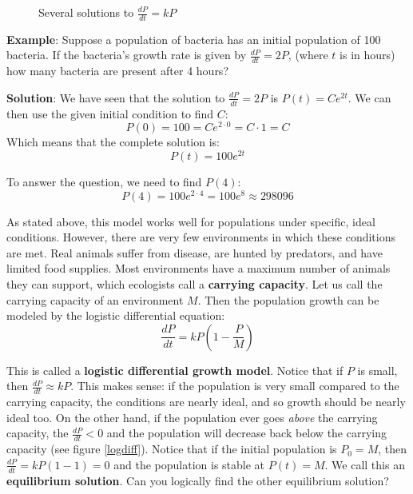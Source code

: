 \begin{figure}
\centering
    \caption{Several solutions to $\frac{dP}{dt} = kP$}
    \label{expdiff}
\end{figure}


\textbf{Example}: Suppose a population of bacteria has an initial population 
of 100 bacteria. If the bacteria's growth rate is given by $\frac{dP}{dt} = 
2P$, (where $t$ is in hours) how many bacteria are present after 4 hours?

\textbf{Solution}: We have seen that the solution to $\frac{dP}{dt} = 2P$ is 
$P(t) = Ce^{2t}$. We can then use the given initial condition to find $C$:
$$P(0) = 100 = Ce^{2 \cdot 0} = C \cdot 1 = C$$
Which means that the complete solution is:
$$P(t) = 100 e^{2t}$$

To answer the question, we need to find $P(4)$:
$$P(4) = 100 e^{2 \cdot 4} = 100 e^{8} \approx 298096$$

As stated above, this model works well for populations under specific, ideal 
conditions. However, there are very few environments in which these conditions 
are met. Real animals suffer from disease, are hunted by predators, and have 
limited food supplies. Most environments have a maximum number of animals they 
can support, which ecologists call a \textbf{carrying capacity}. Let us call the carrying capacity of an environment $M$. Then the 
population growth can be modeled by the logistic differential equation: 
$$\frac{dP}{dt} = kP \left( 1 - \frac{P}{M} \right)$$

This is called a \textbf{logistic differential growth model}. Notice that if $P$ is small, then $\frac{dP}{dt} 
\approx kP$. This makes sense: if the population is very small compared to the 
carrying capacity, the conditions are nearly ideal, and so growth should be 
nearly ideal too. On the other hand, if the population ever goes \textit{
above} the carrying capacity, the $\frac{dP}{dt} < 0$ and the population will 
decrease back below the carrying capacity (see figure \ref{logdiff}). Notice 
that if the initial population is $P_0 = M$, then $\frac{dP}{dt} = kP \left( 1 
- 1 \right) = 0$ and the population is stable at $P(t) = M$. We call this an 
\textbf{equilibrium solution}. Can you logically 
find the other equilibrium solution? 


